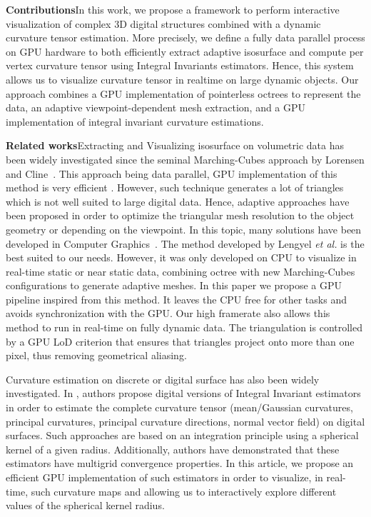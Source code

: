 \documentclass{llncs}
\begin{document}
\noindent\textbf{Contributions}\quad In this work, we propose a
framework to perform interactive visualization of complex 3D digital
structures combined with a dynamic curvature tensor estimation. More
precisely, we define a fully data parallel process on GPU hardware  to
both efficiently extract adaptive isosurface and compute per vertex
curvature tensor using Integral Invariants estimators. Hence, this
system allows us to visualize curvature tensor in realtime on large
dynamic objects. Our approach combines a GPU implementation of
pointerless octrees to represent the data, an adaptive
viewpoint-dependent mesh extraction, and a GPU implementation of
integral invariant curvature estimations.


\vspace{0.2cm}

\sloppy\noindent\textbf{Related works}\quad Extracting and Visualizing
isosurface on volumetric data has been widely investigated since the
seminal Marching-Cubes approach by Lorensen and
Cline~\cite{lorensen1987marching}. This approach being data parallel,
GPU implementation of this method is very efficient
\cite{tatarchuk2007real}. However, such technique generates a lot of
triangles which is not well suited to large digital data. Hence,
adaptive approaches have been proposed in order to optimize the
triangular mesh resolution to the object geometry or depending on the
viewpoint. In this topic, many solutions have been developed in
Computer
Graphics~\cite{shu1995adaptive,schaefer2004dual,lengyel2010voxel,DBLP:journals/cgf/LewinerMPPL10,DBLP:journals/cvgip/LobelloDD14}.
The method developed by Lengyel \textit{et al.}
\cite{lengyel2010voxel} is the best suited to our needs.  However, it
was only developed on CPU to visualize in real-time static or near
static data, combining octree with new Marching-Cubes configurations
to generate adaptive meshes. In this paper we propose a GPU pipeline
inspired from this method.  It leaves the CPU free for other tasks and
avoids synchronization with the GPU.  Our high framerate also allows
this method to run in real-time on fully dynamic data.  The
triangulation is controlled by a GPU LoD criterion that ensures that
triangles project onto more than one pixel, thus removing geometrical
aliasing.

Curvature estimation on discrete or digital surface has also been
widely investigated. In \cite{CVIU2014}, authors propose digital
versions of Integral Invariant estimators
\cite{Pottmann2007,Pottmann2009} in order to estimate the complete
curvature tensor (mean/Gaussian curvatures, principal curvatures,
principal curvature directions, normal vector field) on digital
surfaces. Such approaches are based on an integration principle using
a spherical kernel of a given radius. Additionally, authors have
demonstrated that these estimators have multigrid convergence
properties. In this article, we propose an efficient GPU
implementation of such estimators in order to visualize, in real-time,
such curvature maps and allowing us to interactively explore different
values of the spherical kernel radius.
\end{document}
